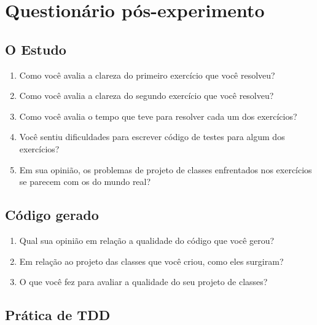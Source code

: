 \chapter{Questionário pós-experimento}
\label{ape:questionario-pos}

\section{O Estudo}

\begin{enumerate}

\item Como você avalia a clareza do primeiro exercício que você resolveu?	

\item Como você avalia a clareza do segundo exercício que você resolveu?	

\item Como você avalia o tempo que teve para resolver cada um dos exercícios?	

\item Você sentiu dificuldades para escrever código de testes para algum dos exercícios?	

\item Em sua opinião, os problemas de projeto de classes enfrentados nos exercícios se parecem com os do mundo real?

\end{enumerate}

\section{Código gerado}

\begin{enumerate}
	
\item Qual sua opinião em relação a qualidade do código que você gerou?	

\item Em relação ao projeto das classes que você criou, como eles surgiram?

\item O que você fez para avaliar a qualidade do seu projeto de classes?	

\end{enumerate}

\section{Prática de TDD}

